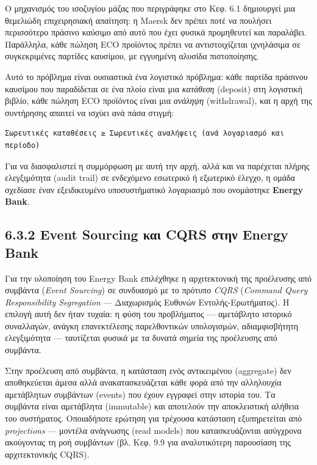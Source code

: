 \documentclass[11pt,a4paper,greek,twoside]{template-xe}
\begin{document}
Ο μηχανισμός του ισοζυγίου μάζας που περιγράφηκε στο Κεφ. 6.1 δημιουργεί
μια θεμελιώδη επιχειρησιακή απαίτηση: η Maersk δεν πρέπει ποτέ να
πουλήσει περισσότερο πράσινο καύσιμο από αυτό που έχει φυσικά
προμηθευτεί και παραλάβει. Παράλληλα, κάθε πώληση ECO προϊόντος πρέπει
να αντιστοιχίζεται ιχνηλάσιμα σε συγκεκριμένες παρτίδες καυσίμου, με
εγγυημένη αλυσίδα πιστοποίησης.

Αυτό το πρόβλημα είναι ουσιαστικά ένα λογιστικό πρόβλημα: κάθε παρτίδα
πράσινου καυσίμου που παραδίδεται σε ένα πλοίο είναι μια \emph{κατάθεση}
(deposit) στη λογιστική βιβλίο, κάθε πώληση ECO προϊόντος είναι μια
\emph{ανάληψη} (withdrawal), και η αρχή της συντήρησης απαιτεί να ισχύει
ανά πάσα στιγμή:

\begin{verbatim}
Σωρευτικές καταθέσεις ≥ Σωρευτικές αναλήψεις (ανά λογαριασμό και περίοδο)
\end{verbatim}

Για να διασφαλιστεί η συμμόρφωση με αυτή την αρχή, αλλά και να παρέχεται
πλήρης ελεγξιμότητα (audit trail) σε ενδεχόμενο εσωτερικό ή εξωτερικό
έλεγχο, η ομάδα σχεδίασε έναν εξειδικευμένο υποσυστήματικό λογαριασμό
που ονομάστηκε \textbf{Energy Bank}.

\subsection{6.3.2 Event Sourcing και CQRS στην Energy
Bank}\label{event-sourcing-ux3baux3b1ux3b9-cqrs-ux3c3ux3c4ux3b7ux3bd-energy-bank}

Για την υλοποίηση του Energy Bank επιλέχθηκε η αρχιτεκτονική της
προέλευσης από συμβάντα (\emph{Event Sourcing}) σε συνδυασμό με το
πρότυπο \emph{CQRS} (\emph{Command Query Responsibility Segregation} ---
Διαχωρισμός Ευθυνών Εντολής-Ερωτήματος). Η επιλογή αυτή δεν ήταν τυχαία:
η φύση του προβλήματος --- αμετάβλητο ιστορικό συναλλαγών, ανάγκη
επανεκτέλεσης παρελθοντικών υπολογισμών, αδιαμφισβήτητη ελεγξιμότητα ---
ταυτίζεται φυσικά με τα δυνατά σημεία της προέλευσης από συμβάντα.

Στην προέλευση από συμβάντα, η κατάσταση ενός αντικειμένου (aggregate)
δεν αποθηκεύεται άμεσα αλλά ανακατασκευάζεται κάθε φορά από την
αλληλουχία αμετάβλητων συμβάντων (events) που έχουν εγγραφεί στην
ιστορία του. Τα συμβάντα είναι αμετάβλητα (immutable) και αποτελούν την
αποκλειστική αλήθεια του συστήματος. Οποιαδήποτε ερώτηση για τρέχουσα
κατάσταση εξυπηρετείται από \emph{projections} --- μοντέλα ανάγνωσης
(read models) που κατασκευάζονται ασύγχρονα ακούγοντας τη ροή συμβάντων
(βλ. Κεφ. 9.9 για αναλυτικότερη παρουσίαση της αρχιτεκτονικής CQRS).
\end{document}
